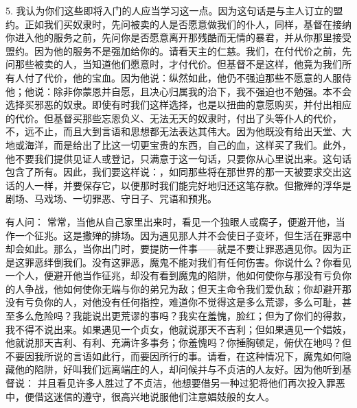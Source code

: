 5. 我认为你们这些即将入门的人应当学习这一点。因为这句话是与主人订立的盟约。正如我们买奴隶时，先问被卖的人是否愿意做我们的仆人，同样，基督在接纳你进入他的服务之前，先问你是否愿意离开那残酷而无情的暴君，并从你那里接受盟约。因为他的服务不是强加给你的。请看天主的仁慈。我们，在付代价之前，先问那些被卖的人，当知道他们愿意时，才付代价。但基督不是这样，他竟为我们所有人付了代价，他的宝血。因为他说：纵然如此，他仍不强迫那些不愿意的人服侍他；他说：除非你蒙恩并自愿，且决心归属我的治下，我不强迫也不勉强。本不会选择买邪恶的奴隶。即使有时我们这样选择，也是以扭曲的意愿购买，并付出相应的代价。但基督买那些忘恩负义、无法无天的奴隶时，付出了头等仆人的代价，不，远不止，而且大到言语和思想都无法表达其伟大。因为他既没有给出天堂、大地或海洋，而是给出了比这一切更宝贵的东西，自己的血，这样买了我们。此外，他不要我们提供见证人或登记，只满意于这一句话，只要你从心里说出来。这句话包含了所有。因此，我们要这样说：，如同那些将在那世界的那一天被要求交出这话的人一样，并要保存它，以便那时我们能完好地归还这笔存款。但撒殚的浮华是剧场、马戏场、一切罪恶、守日子、咒语和预兆。\par

有人问： 常常，当他从自己家里出来时，看见一个独眼人或瘸子，便避开他，当作一个征兆。这是撒殚的排场。因为遇见那人并不会使日子变坏，但生活在罪恶中却会如此。那么，当你出门时，要提防一件事——就是不要让罪恶遇见你。因为正是这罪恶绊倒我们。没有这罪恶，魔鬼不能对我们有任何伤害。你说什么？你看见一个人，便避开他当作征兆，却没有看到魔鬼的陷阱，他如何使你与那没有亏负你的人争战，他如何使你无端与你的弟兄为敌；但天主命令我们爱仇敌；你却避开那没有亏负你的人，对他没有任何指控，难道你不觉得这是多么荒谬，多么可耻，甚至多么危险吗？我能说出更荒谬的事吗？我实在羞愧，脸红；但为了你们的得救，我不得不说出来。如果遇见一个贞女，他就说那天不吉利；但如果遇见一个娼妓，他就说那天吉利、有利、充满许多事务；你羞愧吗？你捶胸顿足，俯伏在地吗？但不要因我所说的言语如此行，而要因所行的事。请看，在这种情况下，魔鬼如何隐藏他的陷阱，好叫我们远离端庄的人，却问候并与不贞洁的人友好。因为他听到基督说：  并且看见许多人胜过了不贞洁，他想要借另一种过犯将他们再次投入罪恶中，便借这迷信的遵守，很高兴地说服他们注意娼妓般的女人。\par

